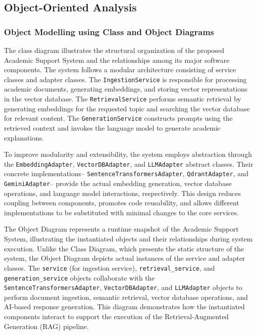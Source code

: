 \subsection{Object-Oriented Analysis}

\subsubsection{Object Modelling using Class and Object Diagrams}
The class diagram illustrates the structural organization of the proposed Academic Support System and the relationships among its major software components. The system follows a modular architecture consisting of service classes and adapter classes. The \texttt{IngestionService} is responsible for processing academic documents, generating embeddings, and storing vector representations in the vector database. The \texttt{RetrievalService} performs semantic retrieval by generating embeddings for the requested topic and searching the vector database for relevant content. The \texttt{GenerationService} constructs prompts using the retrieved context and invokes the language model to generate academic explanations. \par

To improve modularity and extensibility, the system employs abstraction through the \texttt{EmbeddingAdapter}, \texttt{VectorDBAdapter}, and \texttt{LLMAdapter} abstract classes. Their concrete implementations-- \texttt{SentenceTransformersAdapter}, \texttt{QdrantAdapter}, and \texttt{GeminiAdapter}-- provide the actual embedding generation, vector database operations, and language model interactions, respectively. This design reduces coupling between components, promotes code reusability, and allows different implementations to be substituted with minimal changes to the core services. \par

The Object Diagram represents a runtime snapshot of the Academic Support System, illustrating the instantiated objects and their relationships during system execution. Unlike the Class Diagram, which presents the static structure of the system, the Object Diagram depicts actual instances of the service and adapter classes. The \texttt{service} (for ingestion service), \texttt{retrieval\_service}, and \texttt{generation\_service} objects collaborate with the \texttt{SentenceTransformersAdapter}, \texttt{VectorDBAdapter}, and \texttt{LLMAdapter} objects to perform document ingestion, semantic retrieval, vector database operations, and AI-based response generation. This diagram demonstrates how the instantiated components interact to support the execution of the Retrieval-Augmented Generation (RAG) pipeline. \par

